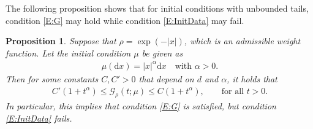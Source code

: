 \documentclass[12pt]{report}
\theoremstyle{plain}
\newtheorem{proposition}[theorem]{Proposition}
\theoremstyle{definition}
\numberwithin{equation}{section}
\newcommand{\ud}{\ensuremath{ \mathrm{d} }}
\begin{document}
The following proposition shows that for initial conditions with unbounded tails, condition
\eqref{E:G} may hold while condition \eqref{E:InitData} may fail.

\begin{proposition} \label{P:growtail}
	Suppose that $\rho=\exp(-|x|)$, which is an admissible weight function. Let the initial condition
	$\mu$ be given as
	\begin{align*}
	\mu(\ud x) = |x|^\alpha \ud x \quad \text{with $\alpha>0$}.
	\end{align*}
	Then for some constants $C, C'>0$ that depend on $d$ and $\alpha$, it holds that
	\begin{align} \label{E:growtail}
	C' (1+t^\alpha) \le \mathcal{G}_\rho(t;\mu) \le C (1+t^\alpha), \qquad \text{for all $t>0$}.
	\end{align}
	In particular, this implies that condition \eqref{E:G} is satisfied, but condition
	\eqref{E:InitData} fails.
\end{proposition}
\end{document}
